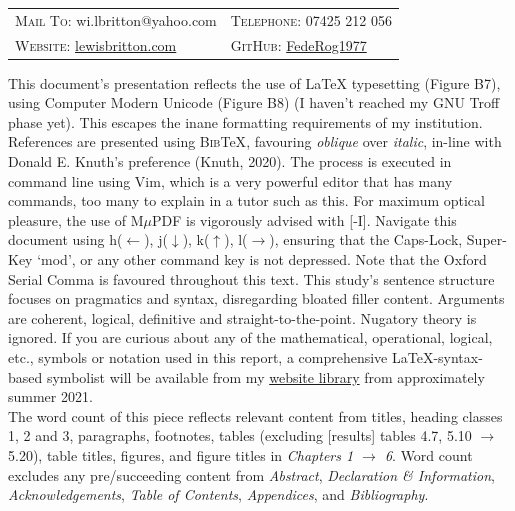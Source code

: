 \documentclass[11pt, english]{article}
\begin{document}
	\begin{center}
		\small
	\begin{tabular}{p{5.45cm}|p{5.45cm}}
		\textsc{Mail To:} wi.lbritton@yahoo.com & \textsc{Telephone:} 07425 212 056\\
		\textsc{Website:} \href{http://lewisbritton.com}{lewisbritton.com} & \textsc{GitHub:} \href{https://github.com/FedeRog1977}{FedeRog1977}\\
	\end{tabular}
	\end{center}

	This document’s presentation reflects the use of {\LaTeX} typesetting (Figure B7), using Computer Modern Unicode (Figure B8) (I haven't reached my GNU Troff phase yet). This escapes the inane formatting requirements of my institution. References are presented using \textsc{Bib}{\TeX}, favouring \textsl{oblique} over \textit{italic}, in-line with Donald E. Knuth’s preference (Knuth, 2020). The process is executed in command line using Vim, which is a very powerful editor that has many commands, too many to explain in a tutor such as this. For maximum optical pleasure, the use of M$\mu$PDF is vigorously advised with [-I]. Navigate this document using h($\leftarrow$), j($\downarrow$), k($\uparrow$), l($\rightarrow$), ensuring that the Caps-Lock, Super-Key `mod', or any other command key is not depressed. Note that the Oxford Serial Comma is favoured throughout this text. This study's sentence structure focuses on pragmatics and syntax, disregarding bloated filler content. Arguments are coherent, logical, definitive and straight-to-the-point. Nugatory theory is ignored. If you are curious about any of the mathematical, operational, logical, etc., symbols or notation used in this report, a comprehensive {\LaTeX}-syntax-based symbolist will be available from my \href{http://lewisbritton.com/Library.html}{website library} from approximately summer 2021.\\
 
	The word count of this piece reflects relevant content from titles, heading classes 1, 2 and 3, paragraphs, footnotes, tables (excluding [results] tables 4.7, 5.10 $\rightarrow$ 5.20), table titles, figures, and figure titles in \textit{Chapters 1 $\rightarrow$ 6}. Word count excludes any pre/succeeding content from \textit{Abstract}, \textit{Declaration \& Information}, \textit{Acknowledgements}, \textit{Table of Contents}, \textit{Appendices}, and \textit{Bibliography}.\\
\end{document}
